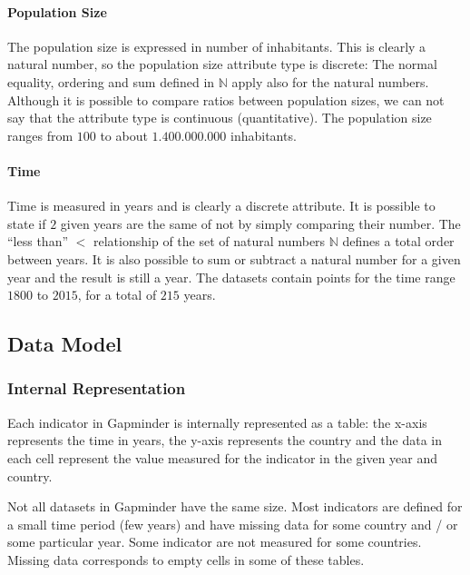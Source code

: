 \paragraph{Population Size}
The population size is expressed in number of inhabitants.
This is clearly a natural number, so the population size attribute type is discrete:
The normal equality, ordering and sum defined in $\mathbb{N}$ apply also for the natural numbers.
Although it is possible to compare ratios between population sizes, we can not say that the attribute type is continuous (quantitative). 
The population size ranges from $100$ to about $1.400.000.000$ inhabitants.

\paragraph{Time}
Time is measured in years and is clearly a discrete attribute.
It is possible to state if $2$ given years are the same of not by simply comparing their number.
The ``less than'' $<$ relationship of the set of natural numbers $\mathbb{N}$ defines a total order between years.
It is also possible to sum or subtract a natural number for a given year and the result is still a year.
The datasets contain points for the time range $1800$ to $2015$, for a total of $215$ years.


\subsection{Data Model}

\subsubsection{Internal Representation}
\label{subsubsec:internal_representation}
Each indicator in Gapminder is internally represented as a table:
the x-axis represents the time in years, the y-axis represents the country and the data in each cell represent the value measured for the indicator in the given year and country.

Not all datasets in Gapminder have the same size.
Most indicators are defined for a small time period (few years) and have missing data for some country and / or some particular year.
Some indicator are not measured for some countries.
Missing data corresponds to empty cells in some of these tables.


